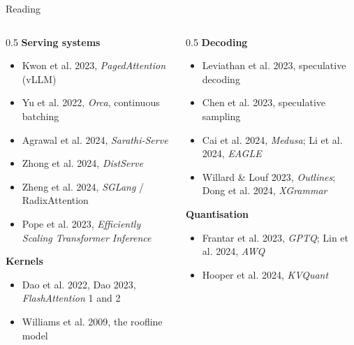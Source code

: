 \documentclass[aspectratio=169,10pt]{beamer}
\begin{document}
\appendix

\begin{frame}{Reading}
  \begin{columns}[T]
    \begin{column}{0.5\textwidth}
      \textbf{Serving systems}
      \begin{itemize}\footnotesize
        \item Kwon et al. 2023, \textit{PagedAttention} (vLLM)
        \item Yu et al. 2022, \textit{Orca}, continuous batching
        \item Agrawal et al. 2024, \textit{Sarathi-Serve}
        \item Zhong et al. 2024, \textit{DistServe}
        \item Zheng et al. 2024, \textit{SGLang} / RadixAttention
        \item Pope et al. 2023, \textit{Efficiently Scaling Transformer
          Inference}
      \end{itemize}
      \vspace{0.3em}
      \textbf{Kernels}
      \begin{itemize}\footnotesize
        \item Dao et al. 2022, Dao 2023, \textit{FlashAttention} 1 and 2
        \item Williams et al. 2009, the roofline model
      \end{itemize}
    \end{column}
    \begin{column}{0.5\textwidth}
      \textbf{Decoding}
      \begin{itemize}\footnotesize
        \item Leviathan et al. 2023, speculative decoding
        \item Chen et al. 2023, speculative sampling
        \item Cai et al. 2024, \textit{Medusa}; Li et al. 2024, \textit{EAGLE}
        \item Willard \& Louf 2023, \textit{Outlines}; Dong et al. 2024,
          \textit{XGrammar}
      \end{itemize}
      \vspace{0.3em}
      \textbf{Quantisation}
      \begin{itemize}\footnotesize
        \item Frantar et al. 2023, \textit{GPTQ}; Lin et al. 2024, \textit{AWQ}
        \item Hooper et al. 2024, \textit{KVQuant}
      \end{itemize}

\end{column}
\end{columns}
\end{frame}
\end{document}
